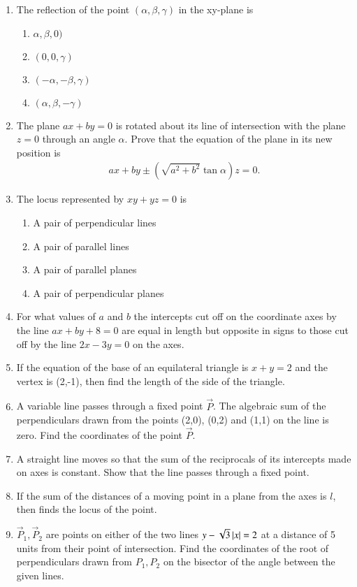 \begin{enumerate}[label=\thesubsection.\arabic*,ref=\thesubsection.\theenumi]
\begin{enumerate}
\end{enumerate}
\item The reflection of the point $(\alpha, \beta, \gamma )$ in the xy-plane is 
\begin{enumerate}
	\item $\alpha,\beta,0)$
	\item $(0,0,\gamma)$
	\item $(-\alpha,-\beta,\gamma)$
	\item $(\alpha,\beta,-\gamma)$
\end{enumerate}
\item The plane $ax+by=0$ is rotated about its line of intersection with the plane $z=0$ through an angle $\alpha.$ Prove that the equation of the plane in its new position is 
\begin{align*}
	ax+by \pm (\sqrt{a^2+b^2} \tan\alpha)z=0.
\end{align*}
\item The locus represented by $xy+yz=0$ is 
\begin{enumerate}
	\item A pair of perpendicular lines
	\item A pair of parallel lines
	\item A pair of parallel planes 
	\item A pair of perpendicular planes
\end{enumerate}
\item For what values of $a$ and $b$ the intercepts cut off on the coordinate axes by the line $ax+by+8=0$ are equal in length but opposite in signs to those cut off by the line $2x-3y=0$ on the axes.
\item If the equation of the base of an equilateral triangle is $x+y=2$ and the vertex is (2,-1), then find the length of the side of the triangle. 
\item A variable line passes through a fixed point $\vec{P}$. The algebraic sum of the perpendiculars drawn from the points (2,0), (0,2) and (1,1) on the line is zero. Find the coordinates of the point $\vec{P}$.  
\item A straight line moves so that the sum of the reciprocals of its intercepts made on axes is constant. Show that the line passes through a fixed point. 
\item If the sum of the distances of a moving point in a plane from the axes is $l$, then finds the locus of the point.  
\item $\vec{P}_1,\vec{P}_2$ are points on either of the two lines $y-\sqrt{3}\left\vert x\right\vert=2$ at a distance of 5 units from their point of intersection. Find the coordinates of the root of perpendiculars drawn from $P_1, P_2$ on the bisector of the angle between the given lines.

\end{enumerate}
